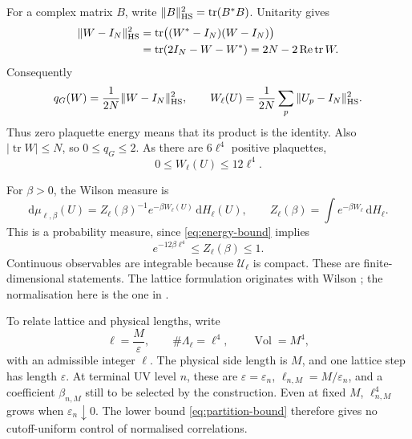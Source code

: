 \documentclass[11pt,reqno]{amsart}
\numberwithin{equation}{section}
\theoremstyle{definition}
\theoremstyle{remark}
\newcommand{\dd}{\mathrm d}
\DeclareMathOperator{\tr}{tr}
\DeclareMathOperator{\Vol}{Vol}
\begin{document}
For a complex matrix \(B\), write
\(\|B\|_{\rm HS}^2=\tr(B^*B)\). Unitarity gives
\begin{align*}
 \|W-I_N\|_{\rm HS}^2
 &=\tr\bigl((W^*-I_N)(W-I_N)\bigr)\\
 &=\tr(2I_N-W-W^*)
   =2N-2\operatorname{Re}\tr W.
\end{align*}
Consequently
\begin{equation}
 q_G(W)=\frac1{2N}\|W-I_N\|_{\rm HS}^2,
 \qquad
 W_\ell(U)=\frac1{2N}\sum_p\|U_p-I_N\|_{\rm HS}^2.
 \label{eq:energy-square}
\end{equation}
Thus zero plaquette energy means that its product is the identity.
Also \(|\tr W|\le N\), so \(0\le q_G\le2\). As there are
\(6\ell^4\) positive plaquettes,
\begin{equation}
                    0\le W_\ell(U)\le12\ell^4.
 \label{eq:energy-bound}
\end{equation}

For \(\beta>0\), the Wilson measure is
\begin{equation}
 \dd\mu_{\ell,\beta}(U)
   =Z_\ell(\beta)^{-1}e^{-\beta W_\ell(U)}\,\dd H_\ell(U),
 \qquad
 Z_\ell(\beta)=\int e^{-\beta W_\ell}\,\dd H_\ell.
 \label{eq:wilson-measure}
\end{equation}
This is a probability measure, since \eqref{eq:energy-bound} implies
\begin{equation}
             e^{-12\beta\ell^4}\le Z_\ell(\beta)\le1.
 \label{eq:partition-bound}
\end{equation}
Continuous observables are integrable because \(\mathcal U_\ell\)
is compact. These are finite-dimensional statements.
The lattice formulation originates with Wilson \cite{Wilson74};
the normalisation here is the one in \cite[Section~2, pp.~13--16]{Main}.

To relate lattice and physical lengths, write
\begin{equation}
              \ell=\frac{M}{\varepsilon},\qquad
              \#\Lambda_\ell=\ell^4,\qquad \Vol=M^4,
 \label{eq:physical-volume}
\end{equation}
with an admissible integer \(\ell\). The physical side length is
\(M\), and one lattice step has length \(\varepsilon\). At terminal
UV level \(n\), these are \(\varepsilon=\varepsilon_n\),
\(\ell_{n,M}=M/\varepsilon_n\), and a coefficient \(\beta_{n,M}\)
still to be selected by the construction. Even at fixed \(M\),
\(\ell_{n,M}^4\) grows when \(\varepsilon_n\downarrow0\).
The lower bound \eqref{eq:partition-bound} therefore gives no
cutoff-uniform control of normalised correlations.
\end{document}
